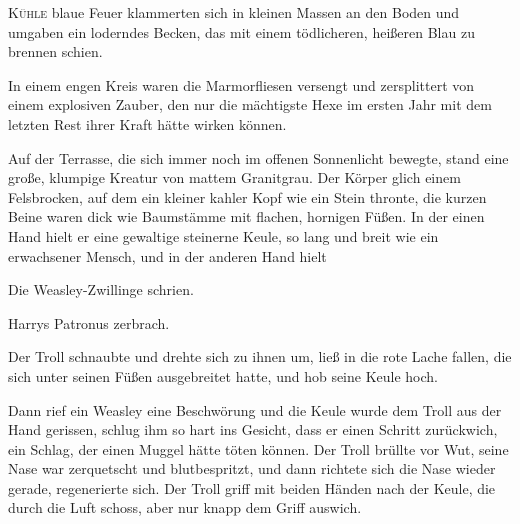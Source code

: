 
\lettrine{K}{ühle} blaue Feuer klammerten sich in kleinen Massen an den Boden und umgaben ein loderndes Becken, das mit einem tödlicheren, heißeren Blau zu brennen schien.

In einem engen Kreis waren die Marmorfliesen versengt und zersplittert von einem explosiven Zauber, den nur die mächtigste Hexe im ersten Jahr mit dem letzten Rest ihrer Kraft hätte wirken können.

Auf der Terrasse, die sich immer noch im offenen Sonnenlicht bewegte, stand eine große, klumpige Kreatur von mattem Granitgrau. Der Körper glich einem Felsbrocken, auf dem ein kleiner kahler Kopf wie ein Stein thronte, die kurzen Beine waren dick wie Baumstämme mit flachen, hornigen Füßen. In der einen Hand hielt er eine gewaltige steinerne Keule, so lang und breit wie ein erwachsener Mensch, und in der anderen Hand hielt 

Die Weasley-Zwillinge schrien.

Harrys Patronus zerbrach.

Der Troll schnaubte und drehte sich zu ihnen um, ließ  in die rote Lache fallen, die sich unter seinen Füßen ausgebreitet hatte, und hob seine Keule hoch.

Dann rief ein Weasley eine Beschwörung und die Keule wurde dem Troll aus der Hand gerissen, schlug ihm so hart ins Gesicht, dass er einen Schritt zurückwich, ein Schlag, der einen Muggel hätte töten können. Der Troll brüllte vor Wut, seine Nase war zerquetscht und blutbespritzt, und dann richtete sich die Nase wieder gerade, regenerierte sich. Der Troll griff mit beiden Händen nach der Keule, die durch die Luft schoss, aber nur knapp dem Griff auswich.


